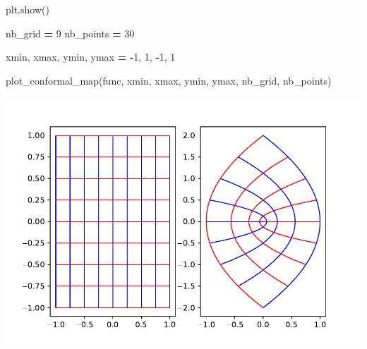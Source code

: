 \documentclass[
]{book}
\newenvironment{Shaded}{\begin{snugshade}}{\end{snugshade}}
\newcommand{\DecValTok}[1]{\textcolor[rgb]{0.00,0.00,0.81}{#1}}
\newcommand{\NormalTok}[1]{#1}
\newcommand{\OperatorTok}[1]{\textcolor[rgb]{0.81,0.36,0.00}{\textbf{#1}}}
\theoremstyle{definition}
\theoremstyle{definition}
\theoremstyle{definition}
\theoremstyle{definition}
\theoremstyle{remark}
\begin{document}
\begin{Shaded}
\begin{Highlighting}[]
\NormalTok{    plt.show()}


\NormalTok{nb\_grid }\OperatorTok{=} \DecValTok{9}
\NormalTok{nb\_points }\OperatorTok{=} \DecValTok{30}

\NormalTok{xmin, xmax, ymin, ymax }\OperatorTok{=} \OperatorTok{{-}}\DecValTok{1}\NormalTok{, }\DecValTok{1}\NormalTok{, }\OperatorTok{{-}}\DecValTok{1}\NormalTok{, }\DecValTok{1}

\NormalTok{plot\_conformal\_map(func, xmin, xmax, ymin, ymax, nb\_grid, nb\_points)}
\end{Highlighting}
\end{Shaded}

\includegraphics{_main_files/figure-latex/unnamed-chunk-45-1.pdf}

  
\end{document}
